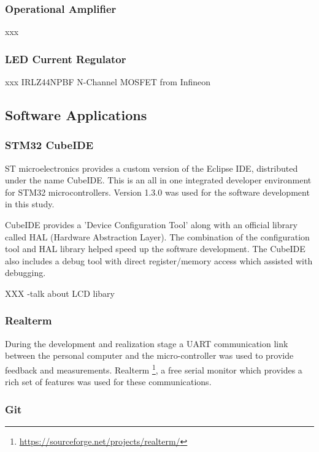 \subsubsection{Operational Amplifier}
xxx

\subsubsection{LED Current Regulator}
xxx
IRLZ44NPBF N-Channel MOSFET from Infineon




\subsection{Software Applications}

\subsubsection{STM32 CubeIDE}
ST microelectronics provides a custom version of the Eclipse IDE, distributed under the name CubeIDE. This is an all in one integrated developer environment for STM32 microcontrollers. Version 1.3.0 was used for the software development in this study.

CubeIDE provides a 'Device Configuration Tool' along with an official library called HAL (Hardware Abstraction Layer). The combination of the configuration tool and HAL library helped speed up the software development. The CubeIDE also includes a debug tool with direct register/memory access which assisted with debugging.

XXX -talk about LCD libary

\subsubsection{Realterm}
During the development and realization stage a UART communication link between the personal computer and the micro-controller was used to provide feedback and measurements. Realterm \footnote{\url{https://sourceforge.net/projects/realterm/}}, a free serial monitor which provides a rich set of features was used for these communications.

\subsubsection{Git}



